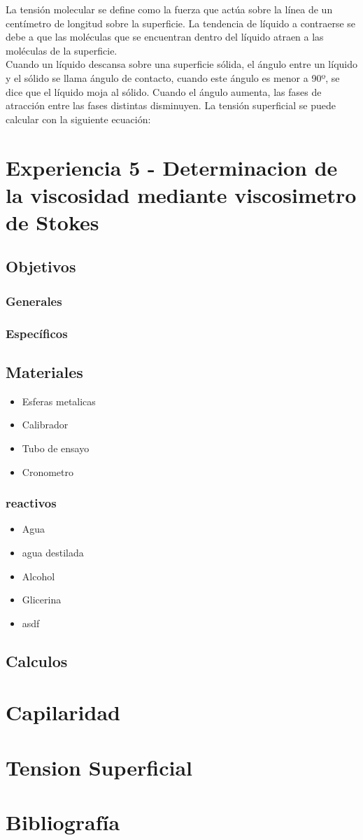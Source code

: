 \documentclass[11pt, letterpaper]{article}
\begin{document}
La  tensión  molecular  se  define  como  la  fuerza  que  actúa  sobre  la  línea  de  un centímetro de longitud sobre la superficie. La tendencia de líquido a contraerse se debe a que las moléculas que se encuentran dentro del líquido atraen a las moléculas de la superficie.\\

Cuando un líquido descansa sobre una superficie sólida, el ángulo entre un líquido y el  sólido  se  llama  ángulo  de  contacto,  cuando  este  ángulo  es  menor  a  90º,  se  dice que el líquido moja al sólido. Cuando el ángulo aumenta, las fases de atracción entre las fases distintas disminuyen. La tensión superficial se puede calcular con la siguiente ecuación:

\section{Experiencia 5 - Determinacion de la viscosidad mediante viscosimetro de Stokes}
\subsection{Objetivos}
\subsubsection{Generales}
\subsubsection{Específicos}
\subsection{Materiales}
\begin{itemize}
	\item Esferas metalicas
	\item Calibrador
	\item Tubo de ensayo
	\item Cronometro
\end{itemize}
\subsubsection{reactivos}
\begin{itemize}
	\item Agua
	\item agua destilada
	\item Alcohol
	\item Glicerina
	\item asdf
\end{itemize}
\subsection{Calculos}

\section{Capilaridad}

\section{Tension Superficial}

\section{Bibliografía}
\end{document}
